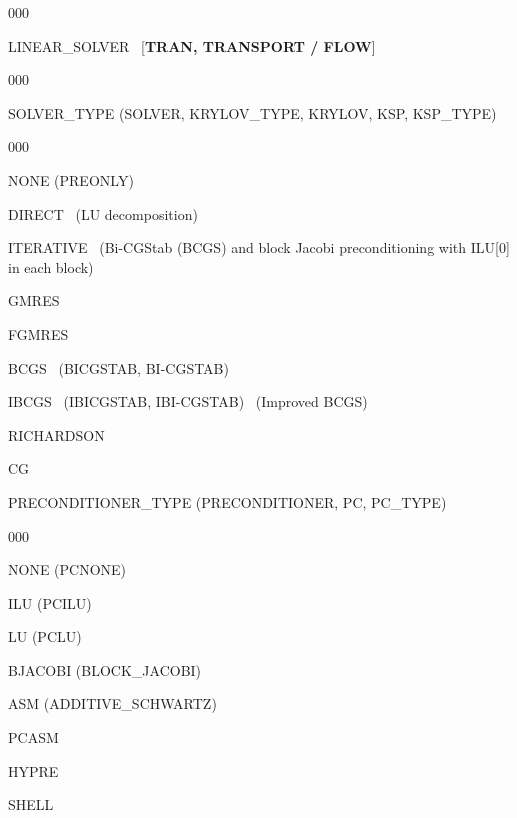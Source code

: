 \hfill\hyperlink{target_key}{\return}


\begin{deflist}{000}
\item[LINEAR\_SOLVER] \ [{\bf TRAN, TRANSPORT / FLOW}]

\begin{deflist}{000}
\item[SOLVER\_TYPE (SOLVER, KRYLOV\_TYPE, KRYLOV, KSP, KSP\_TYPE)] ~

\begin{deflist}{000}
\item[NONE (PREONLY)]
\item[DIRECT] \ (LU decomposition)
\item[ITERATIVE] \ (Bi-CGStab (BCGS) and block Jacobi preconditioning with ILU[0] in each block)
\item[GMRES]
\item[FGMRES]
\item[BCGS] \ (BICGSTAB, BI-CGSTAB) 
\item[IBCGS] \ (IBICGSTAB, IBI-CGSTAB) \ (Improved BCGS)
\item[RICHARDSON]
\item[CG]
\end{deflist}

\item[PRECONDITIONER\_TYPE (PRECONDITIONER, PC, PC\_TYPE)] ~

\begin{deflist}{000}
\item[NONE (PCNONE)]
\item[ILU (PCILU)] 
\item[LU (PCLU)]
\item[BJACOBI (BLOCK\_JACOBI)]
\item[ASM (ADDITIVE\_SCHWARTZ)]
\item[PCASM]
\item[HYPRE]
\item[SHELL]
\end{deflist}


\end{deflist}
\end{deflist}
